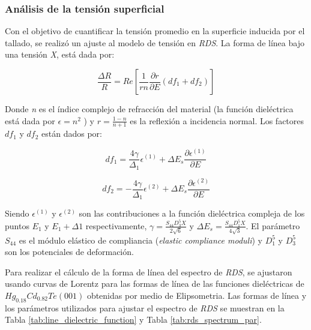 \subsubsection{Análisis de la tensión superficial}
\label{sec:chap4-hgcdte-rds-stress}
Con el objetivo de cuantificar la tensión promedio en la superficie inducida por el tallado, se realizó un ajuste al modelo de tensión en \textit{RDS}. La forma de línea bajo una tensión \textit{X}, está dada por\cite{LastrasMartnez2010}:

\begin{equation}
    \frac{\Delta R}{R} = Re [\frac{1}{r n}\frac{\partial r}{\partial E} (df_{1} + df_{2})]
\end{equation}

Donde \textit{n} es el índice complejo de refracción del material (la función dieléctrica está dada por $ \epsilon = n^{2}$ ) y $ r=\frac{1-n}{n+1} $ es la reflexión a incidencia normal. Los factores $df_{1}$ y $df_{2}$ están dados por:

\begin{equation}
    df_{1} = \frac{4\gamma}{\Delta_{1}} \epsilon^{(1)} +  \Delta E_{s}\frac{\partial \epsilon^{(1)}}{\partial E}
\end{equation}

\begin{equation}
    df_{2} = {-\frac{4\gamma}{\Delta_{1}} \epsilon^{(2)}} +  \Delta E_{s}\frac{\partial \epsilon^{(2)}}{\partial E} 
\end{equation}

Siendo $\epsilon^{(1)}$ y $\epsilon^{(2)}$ son las contribuciones a la función dieléctrica compleja de los puntos 
$E_{1}$ y $E_{1}+\Delta1$ respectivamente, $\gamma = \frac{S_{44} D_{3}^{5} X}{2\sqrt{6}}$ y $\Delta E_{s} = \frac{S_{44} D_{1}^{5} X}{4\sqrt{3}}$. 
El parámetro  $S_{44}$ es el módulo elástico de compliancia (\textit{elastic compliance moduli}) y $D_{1}^{5}$ y $D_{3}^{5}$ son los potenciales de deformación.

Para realizar el cálculo de la forma de línea del espectro de \textit{RDS}, se ajustaron usando curvas de Lorentz para las formas de línea de las funciones dieléctricas de $ Hg_{0.18}Cd_{0.82}Te (001)$ obtenidas por medio de Elipsometria\cite{Camacho2005}. Las formas de línea y los parámetros utilizados para ajustar el espectro de \textit{RDS} se muestran en la Tabla \ref{tab:line_dielectric_function} y Tabla \ref{tab:rds_spectrum_par}\cite{LastrasMartnez2009}\cite{LastrasMartnez2010}. 

